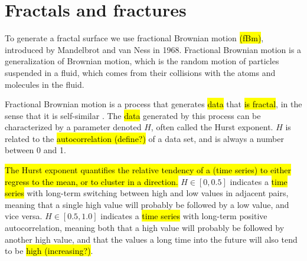 \chapter{Fractals and fractures}
%
%
To generate a fractal surface we use fractional Brownian motion \hl{(fBm)}, introduced by Mandelbrot and van Ness in 1968\cite{mandelbrot1968fractional}. Fractional Brownian motion is a generalization of Brownian motion, which is the random motion of particles suspended in a fluid, which comes from their collisions with the atoms and molecules in the fluid. 

Fractional Brownian motion is a process that generates \hl{data} that \hl{is fractal}, in the sense that it is self-similar%
. The \hl{data} generated by this process can be characterized by a parameter denoted $H$, often called the Hurst exponent. $H$ is related to the \hl{autocorrelation (define?)} of a data set, and is always a number between 0 and 1.

\hl{The Hurst exponent quantifies the relative tendency of a (time series) to either regress to the mean, or to cluster in a direction.} $H\in[0,0.5]$ indicates a \hl{time series} with long-term switching between high and low values in adjacent pairs, meaning that a single high value will probably be followed by a low value, and vice versa. $H\in[0.5,1.0]$ indicates a \hl{time series} with long-term positive autocorrelation, meaning both that a high value will probably be followed by another high value, and that the values a long time into the future will also tend to be \hl{high (increasing?)}.

